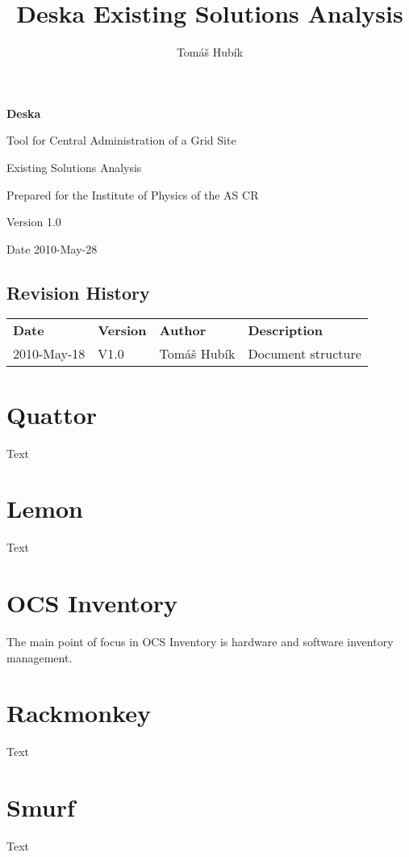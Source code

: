 \documentclass[12pt]{article}
\author{Tomáš Hubík}
\title{Deska Existing Solutions Analysis}
\begin{document}
{\Huge \textbf{Deska}}

\vspace{0.2in}

{\large Tool for Central Administration of a Grid Site}

\vspace{0.5in}

{\large Existing Solutions Analysis}

\vspace{0.2in}

{\large Prepared for the Institute of Physics of the AS CR}

\vspace{0.2in}

{\large Version 1.0}

\vspace{0.2in}

{\large Date 2010-May-28}

\vspace{0.5in}

\subsection*{Revision History}

\begin{table}[!h]
	\begin{tabular}{l l l l}
		\textbf{Date} & \textbf{Version} & \textbf{Author} & \textbf{Description} \\
		2010-May-18 & V1.0 & Tomáš Hubík & Document structure \\ 
	\end{tabular}
	\label{tab:RevisionHistory}
\end{table}

\newpage

\tableofcontents

\newpage




\section{Quattor}
Text



\section{Lemon}
Text



\section{OCS Inventory}
The main point of focus in OCS Inventory is hardware and software inventory management.



\section{Rackmonkey}
Text



\section{Smurf}
Text
\end{document}
